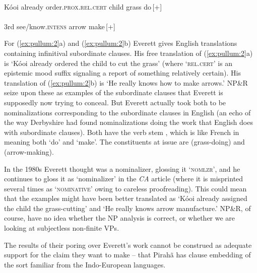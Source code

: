 \documentclass[output=paper,colorlinks,citecolor=brown
]{langscibook}
\begin{document}
\ea
\label{ex:pullum:2}
\ea \gll {} 
          
           \\
        K{\'o}{\textglotstop}oi already order.\textsc{prox}.\textsc{rel.cert} 
           child grass do\,[+]\\
    \ex \gll {}  
               \\
             3rd  see/know.\textsc{intens}  arrow make\,[+]\\
   \z
\z

\noindent
For (\ref{ex:pullum:2}a) and (\ref{ex:pullum:2}b) Everett gives English translations containing
infinitival subordinate clauses. His free translation of (\ref{ex:pullum:2}a) is
`K{\'o}{\textglotstop}oi already ordered the child to cut the grass'
(where `\textsc{rel.cert}' is an epistemic mood suffix signaling a
report of something relatively certain). His translation of (\ref{ex:pullum:2}b)
is `He really knows how to make arrows.' NP\&R seize upon these as
examples of the subordinate clauses that Everett is supposedly
now trying to conceal. But Everett actually took both to be
nominalizations corresponding to the subordinate clauses in English
(an echo of the way Derbyshire had found nominalizations doing the
work that English does with subordinate clauses). Both have the
verb stem , which is like French  in meaning
both `do' and `make'. The constituents at issue are 
(grass-doing) and  (arrow-making).

In the 1980s Everett thought \mbox{} was a nominalizer,
glossing it `\textsc{nomlzr}', and he continues to gloss it as
`nominalizer' in the \textit{CA} article (where it is misprinted
several times as `\textsc{nominative}' owing to careless proofreading).
This could mean that the examples might have been better translated
as `K{\'o}{\textglotstop}oi already assigned the child the grass-cutting'
and `He really knows arrow manufacture.' NP\&R, of course, have no idea
whether the NP analysis is correct, or whether we are looking at
subjectless non-finite VPs.

The results of their poring over Everett's work cannot be construed as
adequate support for the claim they want to make -- that Pirahã
has clause embedding of the sort familiar from the Indo-European
languages.
\end{document}
